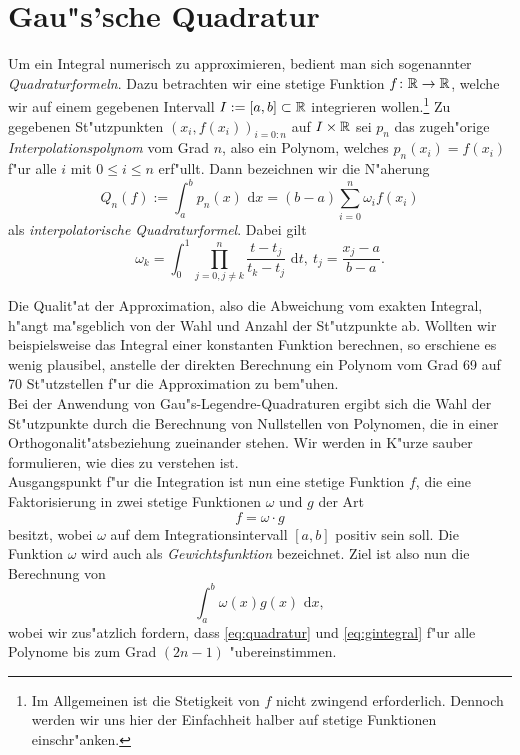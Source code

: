 \section{Gau"s'sche Quadratur}

Um ein Integral numerisch zu approximieren, bedient man sich sogenannter \emph{Quadraturformeln}. Dazu betrachten wir eine stetige Funktion $f\colon\mathbb{R}\to\mathbb{R}$, welche wir auf einem gegebenen Intervall $I:=[a,b]\subset\mathbb{R}$ integrieren wollen.\footnote{Im Allgemeinen ist die Stetigkeit von $f$ nicht zwingend erforderlich. Dennoch werden wir uns hier der Einfachheit halber auf stetige Funktionen einschr"anken.}
Zu gegebenen St"utzpunkten $(x_i, f(x_i))_{i=0:n}$ auf $I\times\mathbb{R}$ sei $p_n$ das zugeh"orige \emph{Interpolationspolynom} vom Grad $n$, also ein Polynom, welches $p_n(x_i) = f(x_i)$ f"ur alle $i$ mit $0\le i\le n$ erf"ullt.
Dann bezeichnen wir die N"aherung
\begin{equation}\label{eq:quadratur}
Q_n(f) := \int_a^b p_n (x)\text{ d}x =
(b-a)\sum_{i=0}^n \omega_i f(x_i)
\end{equation}
als \emph{interpolatorische Quadraturformel}.
Dabei gilt
\[
\omega_k = \int_0^1 \prod_{j=0,j\neq k}^n
\frac{t-t_j}{t_k - t_j} \text{ d}t, \ t_j
= \frac{x_j-a}{b-a}.
\]

\newpage

Die Qualit"at der Approximation, also die Abweichung vom exakten Integral, h"angt ma"sgeblich von der Wahl und Anzahl der St"utzpunkte ab. Wollten wir
beispielsweise das Integral einer konstanten Funktion berechnen, so erschiene es wenig plausibel, anstelle der direkten Berechnung ein Polynom vom Grad 69 auf 70 St"utzstellen f"ur die Approximation zu bem"uhen.\\

Bei der Anwendung von Gau"s-Legendre-Quadraturen ergibt sich die Wahl der St"utzpunkte durch die Berechnung von Nullstellen von Polynomen, die in einer Orthogonalit"atsbeziehung zueinander stehen.
Wir werden in K"urze sauber formulieren, wie dies zu verstehen ist.\\

Ausgangspunkt f"ur die Integration ist nun eine stetige Funktion $f$, die eine Faktorisierung in zwei stetige Funktionen $\omega$ und $g$ der Art
\[
f = \omega \cdot g
\]
besitzt, wobei $\omega$ auf dem Integrationsintervall $[a,b]$ positiv sein soll. Die Funktion $\omega$ wird auch als \emph{Gewichtsfunktion} bezeichnet.
Ziel ist also nun die Berechnung von
\begin{equation}\label{eq:gintegral}
\int_a^b \omega(x)g(x) \text{ d}x,
\end{equation}
wobei wir zus"atzlich fordern, dass \eqref{eq:quadratur} und \eqref{eq:gintegral} f"ur alle Polynome bis zum Grad $(2n-1)$ "ubereinstimmen.\\

